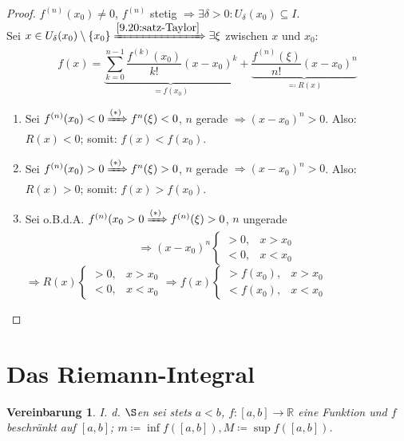 \documentclass[titlepage,ngerman,a4paper,headsepline]{scrartcl}
\newcommand{\R}{\mathbb{R}}
\theoremstyle{named}
\theoremstyle{dotless}
\newtheorem*{vereinbarung}{Vereinbarung}
\begin{document}
\begin{proof}
	$f^{(n)}(x_{0}) \neq 0$, $f^{(n)}$ stetig $\Rightarrow \exists \delta > 0: U_{\delta}(x_{0}) \subseteq I$. \\
	Sei $x \in U_{\delta}(x_{0}) \setminus \{ x_{0} \} \xRightarrow[]{\ref{9.20:satz-Taylor}} \exists \xi$ zwischen $x$ und $x_{0}$:
	$$ f(x) = \underbrace{\sum_{k=0}^{n-1} \frac{f^{(k)}(x_{0})}{k!} (x - x_{0})^{k}}_{= f(x_{0})} + \underbrace{\frac{f^{(n)}(\xi)}{n!} (x - x_{0})^{n}}_{\eqqcolon R(x)} $$
	\begin{enumerate}
		\item Sei $f^{(n)}(x_{0}) < 0 \xRightarrow[]{(*)} f^{n}(\xi) < 0$, $n$ gerade $\Rightarrow (x - x_{0})^{n} > 0$. Also: $R(x) < 0$; somit: $f(x) < f(x_{0})$.
		\item Sei $f^{(n)}(x_{0}) > 0 \xRightarrow[]{(*)} f^{n}(\xi) > 0$, $n$ gerade $\Rightarrow (x - x_{0})^{n} > 0$. Also: $R(x) > 0$; somit: $f(x) > f(x_{0})$.
		\item Sei o.B.d.A. $f^{(n)}(x_{0} > 0 \xRightarrow[]{(*)} f^{(n)}(\xi) > 0$, $n$ ungerade
			$$ \Rightarrow (x - x_{0})^{n} \begin{cases} > 0, & x > x_{0} \\ < 0, & x < x_{0} \end{cases} $$
			$\Rightarrow R(x) \begin{cases} > 0, & x > x_{0} \\ < 0, & x < x_{0} \end{cases} \Rightarrow f(x) \begin{cases} > f(x_{0}), & x > x_{0} \\ < f(x_{0}), & x < x_{0} \end{cases}$
	\end{enumerate}
\end{proof}


\newpage


\section{Das Riemann-Integral}

\begin{vereinbarung}
I. d. $\S$en sei stets $a < b$, $f \colon [a, b] \rightarrow \R$ eine Funktion und $f$ beschränkt auf $[a, b]$; $m \coloneqq \inf f([a, b]), M \coloneqq \sup f([a, b])$.
\end{vereinbarung}
\end{document}
